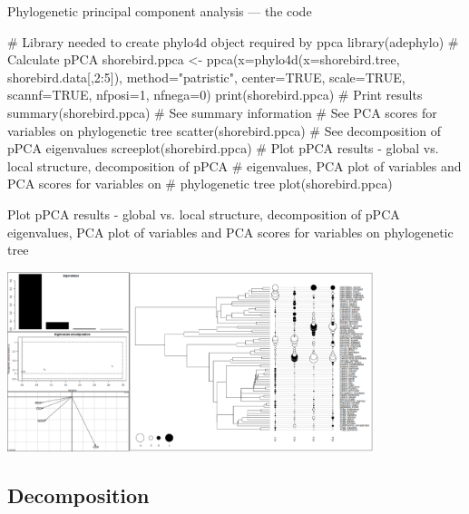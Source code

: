 \documentclass[compress, xelatex, 11pt, xcolor=svgnames, aspectratio=169,
	hyperref={
		bookmarks=true,
		unicode=true,
		colorlinks=true,
		pdftitle={Molecular data in R},
		plainpages=false,
		pdfauthor={Vojtech Zeisek},
		pdfsubject={Course about phylogeny and evolution in R},
		pdfcreator={XeLaTeX},
		pdfkeywords={R, evolution, phylogeny, molecular data},
		linkcolor=Crimson, %
		anchorcolor=Magenta, %
		citecolor=Magenta, %
		filecolor=Magenta, %
		menucolor=Magenta, %
		urlcolor=DodgerBlue, %
		},
	url={hyphens, lowtilde} %
	]{beamer}
\begin{document}
\begin{frame}[fragile]{Phylogenetic principal component analysis --- the code}
	\begin{spluscode}
    # Library needed to create phylo4d object required by ppca
    library(adephylo)
    # Calculate pPCA
    shorebird.ppca <- ppca(x=phylo4d(x=shorebird.tree, shorebird.data[,2:5]),
      method="patristic", center=TRUE, scale=TRUE, scannf=TRUE, nfposi=1,
      nfnega=0)
    print(shorebird.ppca) # Print results
    summary(shorebird.ppca) # See summary information
    # See PCA scores for variables on phylogenetic tree
    scatter(shorebird.ppca)
    # See decomposition of pPCA eigenvalues
    screeplot(shorebird.ppca)
    # Plot pPCA results - global vs. local structure, decomposition of pPCA
    # eigenvalues, PCA plot of variables and PCA scores for variables on
    # phylogenetic tree
    plot(shorebird.ppca)
	\end{spluscode}
\end{frame}

\begin{frame}{Plot pPCA results - global vs. local structure, decomposition of pPCA eigenvalues, PCA plot of variables and PCA scores for variables on phylogenetic tree}
	\begin{center}
		\includegraphics[height=5.25cm]{ppca.png}
	\end{center}
\end{frame}

\subsection{Decomposition}
\end{document}

